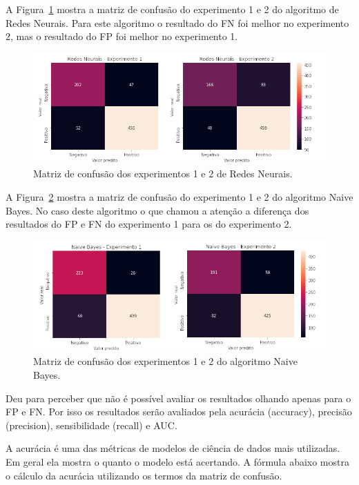 \documentclass[diss,capa]{texufpel}
\begin{document}
A Figura~\ref{fig:matriz-confusao-redes-neurais} mostra a matriz de confusão do experimento 1 e 2 do algoritmo de Redes Neurais.
Para este algoritmo o resultado do FN foi melhor no experimento 2, mas o resultado do FP foi melhor no experimento 1.

\begin{figure}[htbp]
\centering \includegraphics[scale=.62]{imagens/matriz-confusao-redes-neurais.png}
\caption{Matriz de confusão dos experimentos 1 e 2 de Redes Neurais.}
\label{fig:matriz-confusao-redes-neurais}
\end{figure}

A Figura~\ref{fig:matriz-confusao-naive-bayes} mostra a matriz de confusão do experimento 1 e 2 do algoritmo Naive Bayes.
No caso deste algoritmo o que chamou a atenção a diferença dos resultados do FP e FN do experimento 1 para os do experimento 2.

\begin{figure}[htbp]
\centering \includegraphics[scale=.62]{imagens/matriz-confusao-naive-bayes.png}
\caption{Matriz de confusão dos experimentos 1 e 2 do algoritmo Naive Bayes.}
\label{fig:matriz-confusao-naive-bayes}
\end{figure}

Deu para perceber que não é possível avaliar os resultados olhando apenas para o FP e FN.
Por isso os resultados serão avaliados pela acurácia (accuracy), precisão (precision), sensibilidade (recall) e AUC.

A acurácia é uma das métricas de modelos de ciência de dados mais utilizadas.
Em geral ela mostra o quanto o modelo está acertando.
A fórmula abaixo mostra o cálculo da acurácia utilizando os termos da matriz de confusão.
\end{document}
